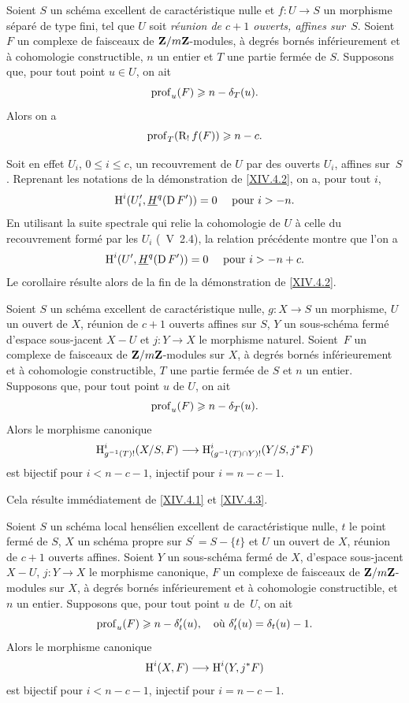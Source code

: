 \begin{corollaire} \label{XIV.4.3}
Soient $S$ un sch\'ema excellent de caract\'eristique nulle et $f\colon U\to S$ un morphisme s\'epar\'e de type fini, tel que $U$ soit \emph{réunion de $c+1$ ouverts, affines sur~$S$}. Soient $F$ un complexe de faisceaux de $\mathbf{Z}/m\mathbf{Z}$-modules, \`a degr\'es born\'es inf\'erieurement et \`a cohomologie constructible, $n$ un entier et $T$ une partie ferm\'ee de $S$. Supposons que, pour tout point $u\in U$, on ait
$$
\operatorname{prof}_{u}(F)\geqslant n-\delta_{T}(u).
$$
Alors on a
$$
\operatorname{prof}_{T}(\operatorname{R}_{!}f(F))\geqslant n-c.
$$
\end{corollaire}

Soit en effet $U_{i}$, $0\leq i\leq c$, un recouvrement de $U$ par des ouverts $U_{i}$, affines sur~$S$. Reprenant les notations de la d\'emonstration de \ref{XIV.4.2}, on a, pour tout $i$,
$$
\operatorname{H}^{i}(U_{i}^{\prime}, \underline{H}^{q}(\operatorname{D} F^{\prime}))=0\quad\textrm{ pour }i>-n.
$$
En utilisant la suite spectrale qui relie la cohomologie de $U$ \`a celle du recouvrement form\'e par les $U_{i}$ (~V~2.4), la relation pr\'ec\'edente montre que l'on a
$$
\operatorname{H}^{i}(U^{\prime}, \underline{H}^{q}(\operatorname{D} F^{\prime}))=0\quad\textrm{ pour }i>-n+c.
$$
Le corollaire r\'esulte alors de la fin de la d\'emonstration de \ref{XIV.4.2}.

\begin{corollaire} \label{XIV.4.4}
Soient $S$ un sch\'ema excellent de caract\'eristique nulle, $g\colon X\to S$ un morphisme, $U$ un ouvert de $X$, r\'eunion de $c+1$ ouverts affines sur $S$, $Y$ un sous-sch\'ema ferm\'e d'espace sous-jacent $X-U$ et $j\colon Y\to X$ le morphisme naturel. Soient~$F$ un complexe de faisceaux de $\mathbf{Z}/m\mathbf{Z}$-modules sur $X$, \`a degr\'es born\'es inf\'erieurement et \`a cohomologie constructible, $T$ une partie ferm\'ee de $S$ et $n$ un entier. Supposons que, pour tout point $u$ de $U$, on ait
$$
\operatorname{prof}_{u}(F)\geqslant n-\delta_{T}(u).
$$
Alors le morphisme canonique
$$
\H_{g^{-1}(T)!}^{i}(X/S, F)\to\H_{(g^{-1}(T)\cap Y)!}^{i}(Y/S, j^{\ast}F)$$
est bijectif pour $i<n-c-1$, injectif pour $i=n-c-1$.
\end{corollaire}

Cela r\'esulte imm\'ediatement de \ref{XIV.4.1} et \ref{XIV.4.3}.

\begin{corollaire} \label{XIV.4.5}
Soient $S$ un sch\'ema local hens\'elien excellent de caract\'eristique nulle, $t$ le point ferm\'e de $S$, $X$ un sch\'ema propre sur $S^{\prime}=S-\{ t\}$ et $U$ un ouvert de $X$, r\'eunion de $c+1$ ouverts affines. Soient $Y$ un sous-sch\'ema ferm\'e de $X$, d'espace sous-jacent $X-U$, $j\colon Y\to X$ le morphisme canonique, $F$ un complexe de faisceaux de $\mathbf{Z}/m\mathbf{Z}$-modules sur $X$, \`a degr\'es born\'es inf\'erieurement et \`a cohomologie constructible, et $n$ un entier. Supposons que, pour tout point $u$ de~$U$, on ait
$$
\operatorname{prof}_{u}(F)\geqslant n-\delta_{t}^{\prime}(u), \quad\text{où } \delta_{t}^{\prime}(u)=\delta_{t}(u)-1.
$$
Alors le morphisme canonique
$$
\H^{i}(X, F)\to\H^{i}(Y, j^{\ast}F)$$
est bijectif pour $i<n-c-1$, injectif pour $i=n-c-1$.
\end{corollaire}

